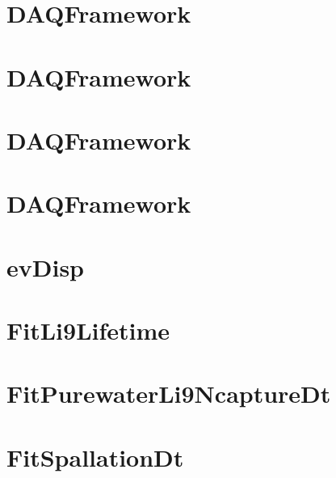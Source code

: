\let\mypdfximage\pdfximage\def\pdfximage{\immediate\mypdfximage}\documentclass[twoside]{book}
\newcommand{\+}{\discretionary{\mbox{\scriptsize$\hookleftarrow$}}{}{}}
\begin{document}
\chapter{DAQFramework}
\label{md_UserTools_CutRecorder_README}

\chapter{DAQFramework}
\label{md_UserTools_DataQualityCuts_README}

\chapter{DAQFramework}
\label{md_UserTools_DecayElectronCuts_README}

\chapter{DAQFramework}
\label{md_UserTools_DefineSignalRegions_README}

\chapter{ev\+Disp}
\label{md_UserTools_evDisp_README}

\chapter{Fit\+Li9\+Lifetime}
\label{md_UserTools_FitLi9Lifetime_README}

\chapter{Fit\+Purewater\+Li9\+Ncapture\+Dt}
\label{md_UserTools_FitPurewaterLi9NcaptureDt_README}

\chapter{Fit\+Spallation\+Dt}
\label{md_UserTools_FitSpallationDt_README}

\end{document}
